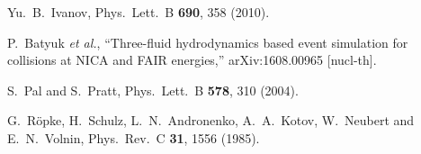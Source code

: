 \documentclass[epj]{svjour}
\begin{document}
\begin{thebibliography}{9}
  Yu.~B.~Ivanov,
  Phys.\ Lett.\ B {\bf 690}, 358 (2010).

  P.~Batyuk {\it et al.},
  ``Three-fluid hydrodynamics based event simulation for collisions at NICA and FAIR energies,''
  arXiv:1608.00965 [nucl-th].
   
  S.~Pal and S.~Pratt,
  Phys.\ Lett.\ B {\bf 578}, 310 (2004).

  G.~R\"opke, H.~Schulz, L.~N.~Andronenko, A.~A.~Kotov, W.~Neubert and E.~N.~Volnin,
  Phys.\ Rev.\ C {\bf 31}, 1556 (1985).


\end{thebibliography}
\end{document}
